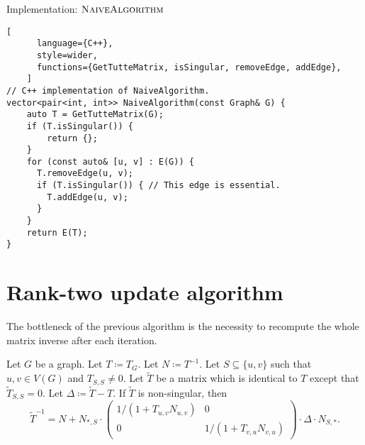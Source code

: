 \begin{programruledcaption}{Implementation: \(\textsc{NaiveAlgorithm}\)}
    \begin{lstlisting}[
      language={C++},
      style=wider,
      functions={GetTutteMatrix, isSingular, removeEdge, addEdge},
    ]
// C++ implementation of NaiveAlgorithm.
vector<pair<int, int>> NaiveAlgorithm(const Graph& G) {
    auto T = GetTutteMatrix(G);
    if (T.isSingular()) {
        return {};
    }
    for (const auto& [u, v] : E(G)) {
      T.removeEdge(u, v);
      if (T.isSingular()) { // This edge is essential.
        T.addEdge(u, v);
      }
    }
    return E(T);
}
    \end{lstlisting}
\end{programruledcaption}

\section{Rank-two update algorithm}

The bottleneck of the previous algorithm is the necessity to recompute the whole matrix inverse after each iteration.

\begin{theorem}
\label{thm:rank-two}
    Let \(G\) be a graph. 
    Let \(T \coloneqq T_G\). 
    Let \(N \coloneqq T^{-1}\).
    Let \(S \subseteq \{u, v\}\) such that \(u, v \in V(G)\) and \(T_{S, S} \neq 0\).
    Let \(\tilde{T}\) be a matrix which is identical to \(T\) except that \(\tilde{T}_{S, S} = 0\).
    Let \(\Delta \coloneqq \tilde{T} - T\).
    If \(\tilde{T}\) is non-singular, then
    \[
        \tilde{T}^{-1} = N + N_{*, S} \cdot 
        \begin{pmatrix}
            1 / (1 + T_{u, v}N_{u, v}) & 0 \\
            0 &  1 / (1 + T_{v, u}N_{v, u})
        \end{pmatrix}
        \cdot \Delta \cdot N_{S, *}.
    \]
\end{theorem}

